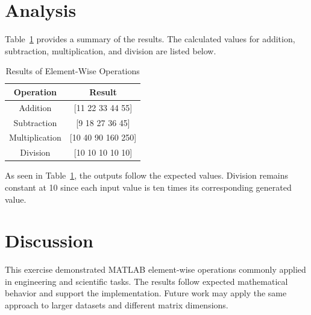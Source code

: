 \documentclass[a4paper,12pt]{article}
\begin{document}
\section{Analysis}

Table~\ref{tab:table1} provides a summary of the results. The calculated values for addition, subtraction, multiplication, and division are listed below.

\setcounter{table}{0}

\begin{table}[h]
    \centering
    \begin{tabular}{|c|c|}
        \hline
        \textbf{Operation} & \textbf{Result} \\
        \hline
        Addition & [11 22 33 44 55] \\
        \hline
        Subtraction & [9 18 27 36 45] \\
        \hline
        Multiplication & [10 40 90 160 250] \\
        \hline
        Division & [10 10 10 10 10] \\
        \hline
    \end{tabular}
    \caption{Results of Element-Wise Operations}
    \label{tab:table1}
\end{table}

As seen in Table~\ref{tab:table1}, the outputs follow the expected values. Division remains constant at 10 since each input value is ten times its corresponding generated value.


\section{Discussion}
This exercise demonstrated MATLAB element-wise operations commonly applied in engineering and scientific tasks. The results follow expected mathematical behavior and support the implementation. Future work may apply the same approach to larger datasets and different matrix dimensions.


\end{document}
